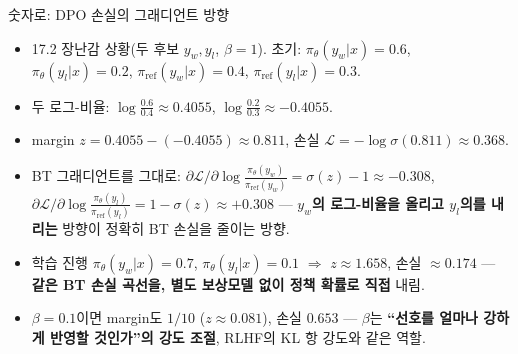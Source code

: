 \begin{frame}{숫자로: DPO 손실의 그래디언트 방향}
  \small
  \begin{itemize}
    \item 17.2 장난감 상황(두 후보 $y_w, y_l$, $\beta =
      1$). 초기: $\pi_\theta(y_w|x) = 0.6$,
      $\pi_\theta(y_l|x) = 0.2$, $\pi_{\text{ref}}(y_w|x)
      = 0.4$, $\pi_{\text{ref}}(y_l|x) = 0.3$.
    \item 두 로그-비율: $\log \tfrac{0.6}{0.4} \approx
      0.4055$, \; $\log \tfrac{0.2}{0.3} \approx -0.4055$.
    \item margin $z = 0.4055 - (-0.4055) \approx 0.811$,
      손실 $\mathcal{L} = -\log\sigma(0.811) \approx
      \mathbf{0.368}$.
    \item BT 그래디언트를 그대로:
      $\partial \mathcal{L}/\partial \log
      \tfrac{\pi_\theta(y_w)}{\pi_{\text{ref}}(y_w)} =
      \sigma(z) - 1 \approx -0.308$,
      $\partial \mathcal{L}/\partial \log
      \tfrac{\pi_\theta(y_l)}{\pi_{\text{ref}}(y_l)} =
      1 - \sigma(z) \approx +0.308$ — \textbf{$y_w$의
      로그-비율을 올리고 $y_l$의를 내리는} 방향이 정확히 BT
      손실을 줄이는 방향.
    \item 학습 진행 $\pi_\theta(y_w|x) = 0.7$,
      $\pi_\theta(y_l|x) = 0.1$ $\Rightarrow$ $z \approx
      1.658$, 손실 $\approx 0.174$ — \textbf{같은 BT 손실
      곡선을, 별도 보상모델 없이 정책 확률로 직접} 내림.
    \item $\beta = 0.1$이면 margin도 $1/10$ ($z \approx
      0.081$), 손실 $0.653$ — $\beta$는 \textbf{``선호를
      얼마나 강하게 반영할 것인가''의 강도 조절}, RLHF의
      KL 항 강도와 같은 역할.
  \end{itemize}
\end{frame}
